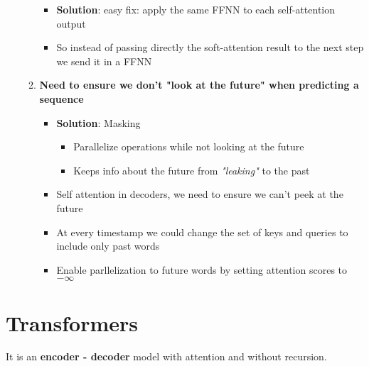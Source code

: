 \begin{itemize}
\begin{enumerate}
        \begin{itemize}
            \item \textbf{Solution}: easy fix: apply the same FFNN to each self-attention output
            \item So instead of passing directly the soft-attention result to the next step we send it in a FFNN
        \end{itemize}
        \item \textbf{Need to ensure we don't "look at the future" when predicting a sequence}
        \begin{itemize}
            \item \textbf{Solution}: Masking
            \begin{itemize}
                \item Parallelize operations while not looking at the future
                \item Keeps info about the future from \textit{"leaking"} to the past
            \end{itemize}
            \item Self attention in decoders, we need to ensure we can't peek at the future
            \item At every timestamp we could change the set of keys and queries to include only past words
            \item Enable parllelization to future words by setting attention scores to \(-\infty\)
        \end{itemize}
    \end{enumerate}
\end{itemize}



\chapter{Transformers}
It is an \textbf{encoder - decoder} model with attention and without recursion.
